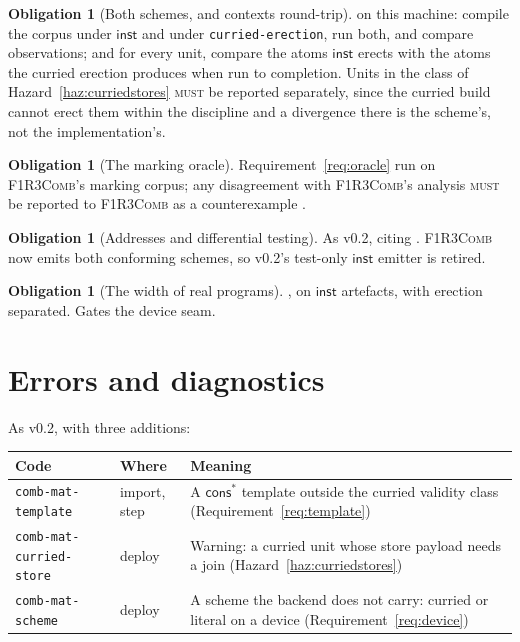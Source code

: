\documentclass[11pt,a4paper]{article}
\newcommand{\code}[1]{\texttt{#1}}
\newcommand{\Comb}{\textsc{F1R3Comb}}
\newcommand{\MUST}{\textsc{must}}
\theoremstyle{definition}
\newtheorem{obligation}[definition]{Obligation}
\theoremstyle{plain}
\newcommand{\inst}{\mathsf{inst}}
\newcommand{\cstar}{\mathsf{cons}^{*}}
\begin{document}
\begin{obligation}[Both schemes, and contexts round-trip]\label{obl:schemes}
\cite[Obl.~11.5, Obl.~11.6]{combspec} on this machine: compile the corpus
under $\inst$ and under \code{curried-erection}, run both, and compare
observations; and for every unit, compare the atoms $\inst$ erects with the
atoms the curried erection produces when run to completion. Units in the
class of Hazard~\ref{haz:curriedstores} \MUST{} be reported separately, since
the curried build cannot erect them within the discipline and a divergence
there is the scheme's, not the implementation's.
\end{obligation}

\begin{obligation}[The marking oracle]\label{obl:marking}
Requirement~\ref{req:oracle} run on \Comb's marking corpus; any disagreement
with \Comb's analysis \MUST{} be reported to \Comb{} as a counterexample
\cite[Obl.~11.4]{combspec}.
\end{obligation}

\begin{obligation}[Addresses and differential testing]\label{obl:addr}
As v0.2, citing \cite[Obl.~11.9, 11.11, 11.14]{combspec}. \Comb{} now emits
both conforming schemes, so v0.2's test-only $\inst$ emitter is retired.
\end{obligation}

\begin{obligation}[The width of real programs]\label{obl:width}
\cite[Obl.~13.7]{matnote}, on $\inst$ artefacts, with erection separated.
Gates the device seam.
\end{obligation}

\section{Errors and diagnostics}\label{sec:errors}

As v0.2, with three additions:

\begin{center}
\begin{tabularx}{\linewidth}{@{}ll>{\raggedright\arraybackslash}X@{}}
\toprule
Code & Where & Meaning\\
\midrule
\code{comb-mat-template} & import, step & A $\cstar$ template outside the
curried validity class (Requirement~\ref{req:template})\\
\code{comb-mat-curried-store} & deploy & Warning: a curried unit whose store
payload needs a join (Hazard~\ref{haz:curriedstores})\\
\code{comb-mat-scheme} & deploy & A scheme the backend does not carry: curried
or literal on a device (Requirement~\ref{req:device})\\
\bottomrule
\end{tabularx}
\end{center}
\end{document}

